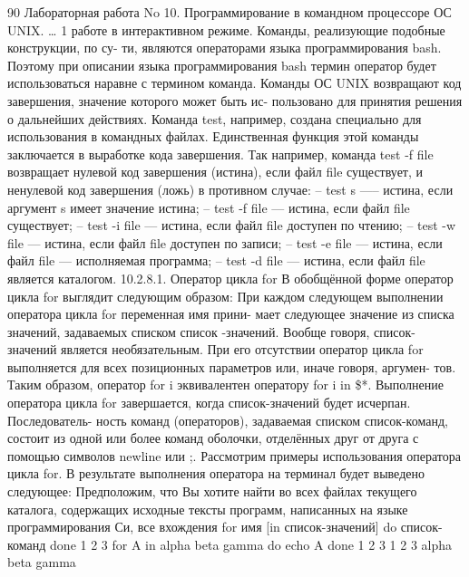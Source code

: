\documentclass[
  letterpaper,
  DIV=11,
  numbers=noendperiod]{scrartcl}
\begin{document}
90 Лабораторная работа No 10. Программирование в командном процессоре ОС
UNIX. \ldots{} 1 работе в интерактивном режиме. Команды, реализующие
подобные конструкции, по су- ти, являются операторами языка
программирования bash. Поэтому при описании языка программирования bash
термин оператор будет использоваться наравне с термином команда. Команды
ОС UNIX возвращают код завершения, значение которого может быть ис-
пользовано для принятия решения о дальнейших действиях. Команда test,
например, создана специально для использования в командных файлах.
Единственная функция этой команды заключается в выработке кода
завершения. Так например, команда test -f file возвращает нулевой код
завершения (истина), если файл file существует, и ненулевой код
завершения (ложь) в противном случае: -- test s ----- истина, если
аргумент s имеет значение истина; -- test -f file --- истина, если файл
file существует; -- test -i file --- истина, если файл file доступен по
чтению; -- test -w file --- истина, если файл file доступен по записи;
-- test -e file --- истина, если файл file --- исполняемая программа; --
test -d file --- истина, если файл file является каталогом. 10.2.8.1.
Оператор цикла for В обобщённой форме оператор цикла for выглядит
следующим образом: При каждом следующем выполнении оператора цикла for
переменная имя прини- мает следующее значение из списка значений,
задаваемых списком список -значений. Вообще говоря, список-значений
является необязательным. При его отсутствии оператор цикла for
выполняется для всех позиционных параметров или, иначе говоря, аргумен-
тов. Таким образом, оператор for i эквивалентен оператору for i in \$*.
Выполнение оператора цикла for завершается, когда список-значений будет
исчерпан. Последователь- ность команд (операторов), задаваемая списком
список-команд, состоит из одной или более команд оболочки, отделённых
друг от друга с помощью символов newline или ;. Рассмотрим примеры
использования оператора цикла for. В результате выполнения оператора на
терминал будет выведено следующее: Предположим, что Вы хотите найти во
всех файлах текущего каталога, содержащих исходные тексты программ,
написанных на языке программирования Си, все вхождения for имя {[}in
список-значений{]} do список-команд done 1 2 3 for A in alpha beta gamma
do echo A done 1 2 3 1 2 3 alpha beta gamma
\end{document}

